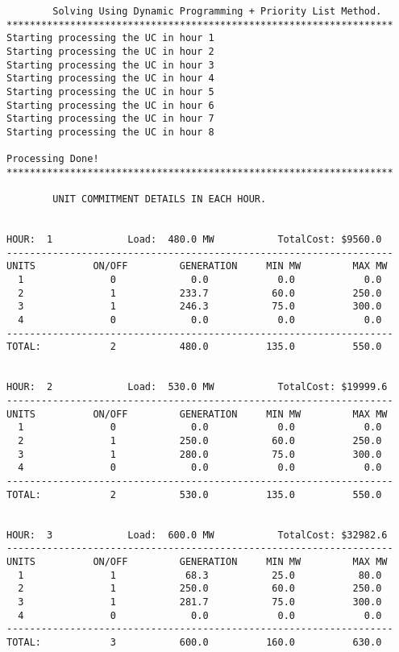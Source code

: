 \begin{verbatim}
		Solving Using Dynamic Programming + Priority List Method.
*******************************************************************
Starting processing the UC in hour 1
Starting processing the UC in hour 2
Starting processing the UC in hour 3
Starting processing the UC in hour 4
Starting processing the UC in hour 5
Starting processing the UC in hour 6
Starting processing the UC in hour 7
Starting processing the UC in hour 8

Processing Done!
*******************************************************************

		UNIT COMMITMENT DETAILS IN EACH HOUR.


HOUR:  1             Load:  480.0 MW           TotalCost: $9560.0
-------------------------------------------------------------------
UNITS          ON/OFF         GENERATION     MIN MW         MAX MW
  1               0             0.0            0.0            0.0
  2               1           233.7           60.0          250.0
  3               1           246.3           75.0          300.0
  4               0             0.0            0.0            0.0
-------------------------------------------------------------------
TOTAL:            2           480.0          135.0          550.0


HOUR:  2             Load:  530.0 MW           TotalCost: $19999.6
-------------------------------------------------------------------
UNITS          ON/OFF         GENERATION     MIN MW         MAX MW
  1               0             0.0            0.0            0.0
  2               1           250.0           60.0          250.0
  3               1           280.0           75.0          300.0
  4               0             0.0            0.0            0.0
-------------------------------------------------------------------
TOTAL:            2           530.0          135.0          550.0


HOUR:  3             Load:  600.0 MW           TotalCost: $32982.6
-------------------------------------------------------------------
UNITS          ON/OFF         GENERATION     MIN MW         MAX MW
  1               1            68.3           25.0           80.0
  2               1           250.0           60.0          250.0
  3               1           281.7           75.0          300.0
  4               0             0.0            0.0            0.0
-------------------------------------------------------------------
TOTAL:            3           600.0          160.0          630.0



\end{verbatim}
